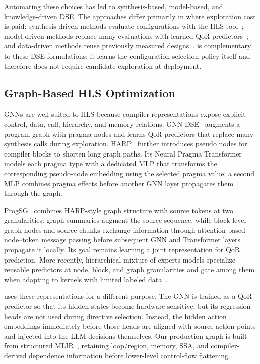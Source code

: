Automating these choices has led to synthesis-based, model-based, and knowledge-driven DSE. The approaches differ primarily in where exploration cost is paid: synthesis-driven methods evaluate configurations with the HLS tool~\cite{mahapatra2014machine,ferretti2018lattice,ferretti2018cluster, sohrabizadeh2020autodse}; model-driven methods replace many evaluations with learned QoR predictors~\cite{dai2018fast,makrani2019xppe,lin2020hl, sohrabizadeh2022automated}; and data-driven methods reuse previously measured designs~\cite{ferretti2020leveraging,ferikoglou2024collectivehls}.
\framework is complementary to these DSE formulations: it learns the configuration-selection policy itself and therefore does not require candidate exploration at deployment.


\subsection{Graph-Based HLS Optimization}
\label{subsec:gnn-background}

GNNs are well suited to HLS because compiler representations expose explicit control, data, call, hierarchy, and memory relations. GNN-DSE~\cite{ sohrabizadeh2022automated} augments a program graph with pragma nodes and learns QoR predictors that replace many synthesis calls during exploration. HARP~\cite{sohrabizadeh2023harp} further introduces pseudo nodes for compiler blocks to shorten long graph paths. Its Neural Pragma Transformer models each pragma type with a dedicated MLP that transforms the corresponding pseudo-node embedding using the selected pragma value; a second MLP combines pragma effects before another GNN layer propagates them through the graph.

ProgSG~\cite{bai2023progsg} combines HARP-style graph structure with source tokens at two granularities: graph summaries augment the source sequence, while block-level graph nodes and source chunks exchange information through attention-based node--token message passing before subsequent GNN and Transformer layers propagate it locally. Its goal remains learning a joint representation for QoR prediction. More recently, hierarchical mixture-of-experts models specialize reusable predictors at node, block, and graph granularities and gate among them when adapting to kernels with limited labeled data~\cite{li2025hierarchical}.

\framework uses these representations for a different purpose. The GNN is trained as a QoR predictor so that its hidden states become hardware-sensitive, but its regression heads are not used during directive selection. Instead, the hidden action embeddings immediately before those heads are aligned with source action points and injected into the LLM decisions themselves. Our production graph is built from structured MLIR~\cite{lattner2021mlir, ye2022scalehls}, retaining loop/region, memory, SSA, and compiler-derived dependence information before lower-level control-flow flattening.


